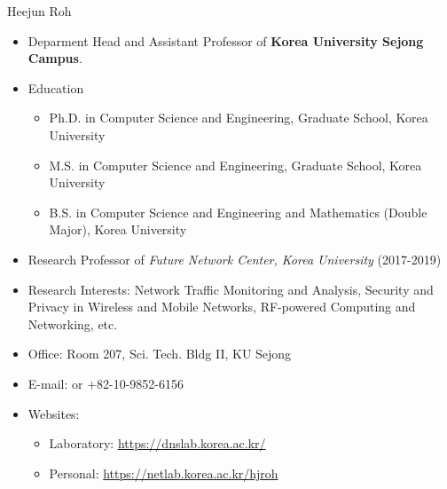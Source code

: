 \titleframe

\begin{frame}{Heejun Roh}
  \begin{itemize}
  \item Deparment Head and Assistant Professor of {\bf Korea University Sejong Campus}.
  \item Education
  \begin{itemize}
    \item Ph.D. in Computer Science and Engineering, Graduate School, Korea University
    \item M.S. in Computer Science and Engineering, Graduate School, Korea University
    \item B.S. in Computer Science and Engineering and Mathematics (Double Major), Korea University
  \end{itemize}
  \item Research Professor of {\em Future Network Center, Korea University} (2017-2019)
  \item Research Interests: Network Traffic Monitoring and Analysis, Security and Privacy in Wireless and Mobile Networks, RF-powered Computing and Networking, etc.
  \item Office: Room 207, Sci. Tech. Bldg II, KU Sejong
  \item E-mail:  or +82-10-9852-6156
  \item Websites:
  \begin{itemize}
    \item Laboratory: \url{https://dnslab.korea.ac.kr/}
    \item Personal: \url{https://netlab.korea.ac.kr/hjroh}
  \end{itemize}
  \end{itemize}
\end{frame}


